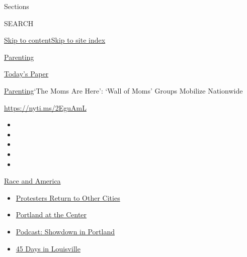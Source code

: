 Sections

SEARCH

\protect\hyperlink{site-content}{Skip to
content}\protect\hyperlink{site-index}{Skip to site index}

\href{https://www.nytimes3xbfgragh.onion/section/parenting}{Parenting}

\href{https://myaccount.nytimes3xbfgragh.onion/auth/login?response_type=cookie\&client_id=vi}{}

\href{https://www.nytimes3xbfgragh.onion/section/todayspaper}{Today's
Paper}

\href{/section/parenting}{Parenting}\textbar{}`The Moms Are Here': `Wall
of Moms' Groups Mobilize Nationwide

\url{https://nyti.ms/2EguAmL}

\begin{itemize}
\item
\item
\item
\item
\item
\end{itemize}

\href{https://www.nytimes3xbfgragh.onion/news-event/george-floyd-protests-minneapolis-new-york-los-angeles?action=click\&pgtype=Article\&state=default\&region=TOP_BANNER\&context=storylines_menu}{Race
and America}

\begin{itemize}
\tightlist
\item
  \href{https://www.nytimes3xbfgragh.onion/2020/07/26/us/protests-portland-seattle-trump.html?action=click\&pgtype=Article\&state=default\&region=TOP_BANNER\&context=storylines_menu}{Protesters
  Return to Other Cities}
\item
  \href{https://www.nytimes3xbfgragh.onion/2020/07/24/us/portland-oregon-protests-white-race.html?action=click\&pgtype=Article\&state=default\&region=TOP_BANNER\&context=storylines_menu}{Portland
  at the Center}
\item
  \href{https://www.nytimes3xbfgragh.onion/2020/07/23/podcasts/the-daily/portland-protests.html?action=click\&pgtype=Article\&state=default\&region=TOP_BANNER\&context=storylines_menu}{Podcast:
  Showdown in Portland}
\item
  \href{https://www.nytimes3xbfgragh.onion/interactive/2020/07/16/us/black-lives-matter-protests-louisville-breonna-taylor.html?action=click\&pgtype=Article\&state=default\&region=TOP_BANNER\&context=storylines_menu}{45
  Days in Louisville}
\end{itemize}

